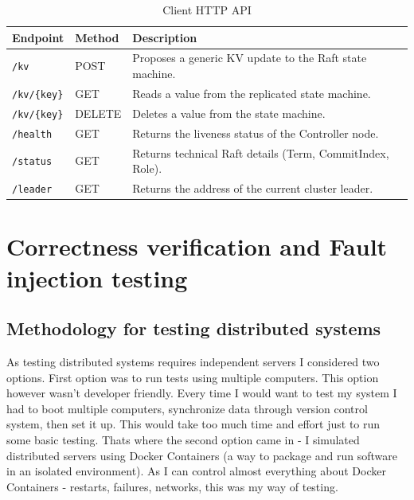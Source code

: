 \documentclass[shortabstract]{iithesis}
\begin{document}
\begin{table}[h!]
\centering
\caption{Client HTTP API}
\label{tab:cp_client_api}
\begin{tabularx}{\textwidth}{|l|l|X|}
\hline
\textbf{Endpoint} & \textbf{Method} & \textbf{Description} \\ \hline
\texttt{/kv} & POST & Proposes a generic KV update to the Raft state machine. \\ \hline
\texttt{/kv/\{key\}} & GET & Reads a value from the replicated state machine. \\ \hline
\texttt{/kv/\{key\}} & DELETE & Deletes a value from the state machine. \\ \hline
\texttt{/health} & GET & Returns the liveness status of the Controller node. \\ \hline
\texttt{/status} & GET & Returns technical Raft details (Term, CommitIndex, Role). \\ \hline
\texttt{/leader} & GET & Returns the address of the current cluster leader. \\ \hline
\end{tabularx}
\end{table}





\chapter{Correctness verification and Fault injection testing}

\section{Methodology for testing distributed systems}

As testing distributed systems requires independent servers I considered two options. First option was to run tests using multiple computers. This option however wasn't developer friendly. Every time I would want to test my system I had to boot multiple computers, synchronize data through version control system, then set it up. This would take too much time and effort just to run some basic testing. Thats where the second option came in - I simulated distributed servers using Docker Containers \cite{docker} (a way to package and run software in an isolated environment). As I can control almost everything about Docker Containers - restarts, failures, networks, this was my way of testing.
\end{document}
